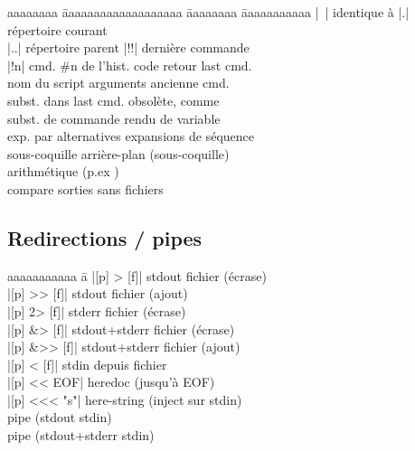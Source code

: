 \documentclass{article}
\begin{document}
\begin{multicols}{4}
    \begin{tabbing}
        aaaaaaaa \= aaaaaaaaaaaaaaaaaaa \= aaaaaaaa \= aaaaaaaaaaa \kill
        \code|~| \> identique à  \>
        \code|.| \> répertoire courant \\
        \code|..| \> répertoire parent \>
        \code|!!| \> dernière commande \\
        \code|!n| \> cmd. \#n de l'hist. \>
         \> code retour last cmd. \\
         \> nom du script \>
        \code{!*} \> arguments ancienne cmd. \\
         \> subst. dans last cmd. \>
         \> obsolète, comme  \\
         \> subst. de commande \>
         \> rendu de variable \\
         \> exp. par alternatives \>
         \> expansions de séquence \\
          sous-coquille
          arrière-plan (sous-coquille) \\
         arithmétique (p.ex ) \\
         \quad compare sorties sans fichiers \\
    \end{tabbing}

    \subsection*{Redirections / pipes}
    \begin{tabbing}
        aaaaaaaaaaa \= a \kill
        \code|[p] > [f]| \> stdout \textrightarrow{} fichier (écrase) \\
        \code|[p] >> [f]| \> stdout \textrightarrow{} fichier (ajout) \\
        \code|[p] 2> [f]| \> stderr \textrightarrow{} fichier (écrase) \\
        \code|[p] &> [f]| \> stdout+stderr \textrightarrow{} fichier (écrase) \\
        \code|[p] &>> [f]| \> stdout+stderr \textrightarrow{} fichier (ajout) \\
        \code|[p] < [f]| \> stdin depuis fichier \\
        \code|[p] << EOF| \> heredoc (jusqu'à EOF) \\
        \code|[p] <<< "s"| \> here-string (inject sur stdin) \\
        \code{[p] | [p]} \> pipe (stdout \textrightarrow{} stdin) \\
        \code{[p] |& [p]} \> pipe (stdout+stderr \textrightarrow{} stdin)
    \end{tabbing}


\end{multicols}
\end{document}

